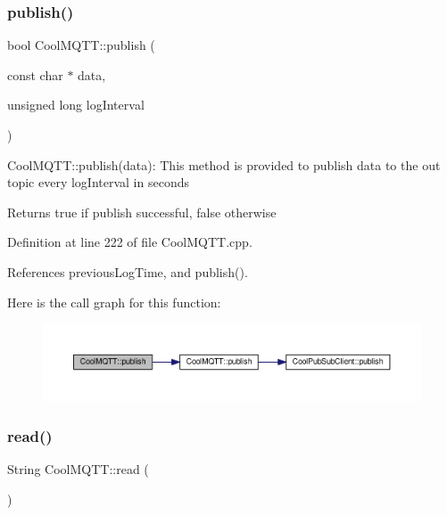 \subsubsection{\texorpdfstring{publish()}{publish()}\hspace{0.1cm}{\footnotesize\ttfamily [2/2]}}
{\footnotesize\ttfamily bool Cool\+M\+Q\+T\+T\+::publish (\begin{DoxyParamCaption}\item[{const char $\ast$}]{data,  }\item[{unsigned long}]{log\+Interval }\end{DoxyParamCaption})}

Cool\+M\+Q\+T\+T\+::publish(data)\+: This method is provided to publish data to the out topic every log\+Interval in seconds

\begin{DoxyReturn}{Returns}
true if publish successful, false otherwise 
\end{DoxyReturn}


Definition at line 222 of file Cool\+M\+Q\+T\+T.\+cpp.



References previous\+Log\+Time, and publish().

Here is the call graph for this function\+:\nopagebreak
\begin{figure}[H]
\begin{center}
\leavevmode
\includegraphics[width=350pt]{d0/dd0/class_cool_m_q_t_t_a613c5e3927ae85bb94fbf648d84d8780_cgraph}
\end{center}
\end{figure}
\mbox{\label{class_cool_m_q_t_t_ae3c18f6ae9723746d32765f1c8f176ca}} 
\subsubsection{\texorpdfstring{read()}{read()}}
{\footnotesize\ttfamily String Cool\+M\+Q\+T\+T\+::read (\begin{DoxyParamCaption}{ }\end{DoxyParamCaption})}

